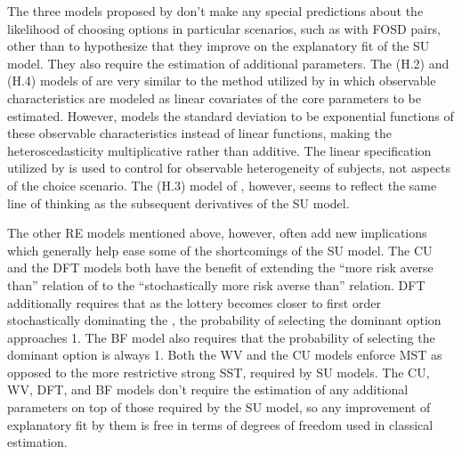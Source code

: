 \documentclass[../main.tex]{subfiles}
\begin{document}
The three models proposed by \textcite{Hey1995a} don't make any special predictions about the likelihood of choosing options in particular scenarios, such as with FOSD pairs, other than to hypothesize that they improve on the explanatory fit of the SU model.
They also require the estimation of additional parameters.
The (H.2) and (H.4) models of \textcite{Hey1995a} are very similar to the method utilized by \textcite[142]{Harrison2009} in which observable characteristics are modeled as linear covariates of the core parameters to be estimated.
However, \textcite{Hey1995a} models the standard deviation to be exponential functions of these observable characteristics instead of linear functions, making the heteroscedasticity multiplicative rather than additive.
The linear specification utilized by \textcite{Harrison2009} is used to control for observable heterogeneity of subjects, not aspects of the choice scenario.
The (H.3) model of \textcite{Hey1995a}, however, seems to reflect the same line of thinking as the subsequent derivatives of the SU model.

The other RE models mentioned above, however, often add new implications which generally help ease some of the shortcomings of the SU model.
The CU and the DFT models both have the benefit of extending the \enquote{more risk averse than} relation of \textcite{Pratt1964} to the \enquote{stochastically more risk averse than} relation.
DFT additionally requires that as the lottery becomes closer to first order stochastically dominating the {\CE}, the probability of selecting the dominant option approaches 1.
The BF model also requires that the probability of selecting the dominant option is always 1.
Both the WV and the CU models enforce MST as opposed to the more restrictive strong SST,  required by SU models.
The CU, WV, DFT, and BF models don't require the estimation of any additional parameters on top of those required by the SU model, so any improvement of explanatory fit by them is free in terms of degrees of freedom used in classical estimation.
\end{document}
